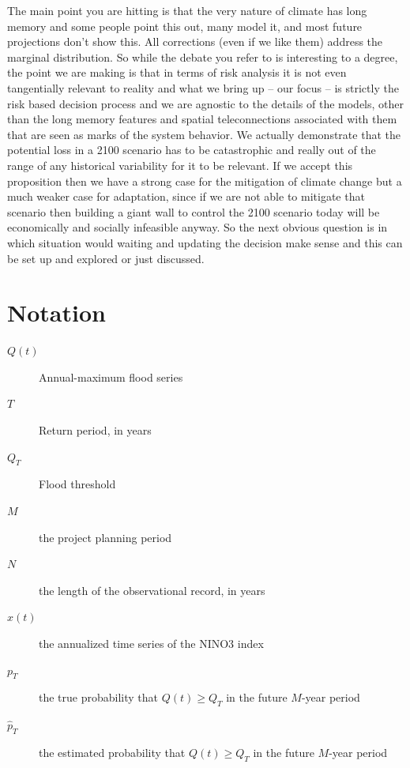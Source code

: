 \documentclass[12pt]{article}
\begin{document}
The main point you are hitting is that the very nature of climate has long memory and some people point this out, many model it, and most future projections don't show this.
All corrections (even if we like them) address the marginal distribution.
So while the debate you refer to is interesting to a degree, the point we are making is that in terms of risk analysis it is not even tangentially relevant to reality and what we bring up -- our focus -- is strictly the risk based decision process and we are agnostic to the details of the models, other than the long memory features and spatial teleconnections associated with them that are seen as marks of the system behavior.
We actually demonstrate that the potential loss in a 2100 scenario has to be catastrophic and really out of the range of any historical variability for it to be relevant.
If we accept this proposition then we have a strong case for the mitigation of climate change but a much weaker case for adaptation, since if we are not able to mitigate that scenario then building a giant wall to control the 2100 scenario today will be economically and socially infeasible anyway.
So the next obvious question is in which situation would waiting and updating the decision make sense and this can be set up and explored or just discussed.


\appendix
\printbibliography{}

\section{Notation}

\begin{description}
  \item[\( Q(t) \)] Annual-maximum flood series
  \item[\( T \)] Return period, in years
  \item[\( Q_T \)] Flood threshold
  \item[\( M \)] the project planning period
  \item[\( N \)] the length of the observational record, in years
  \item[\( x(t) \)] the annualized time series of the NINO3 index
  \item[\( p_T \)] the true probability that \( Q(t) \geq Q_T \) in the future \(M\)-year period
  \item[\( \hat{p}_T \)] the estimated probability that \( Q(t) \geq Q_T \) in the future \(M\)-year period
\end{description}
\end{document}
